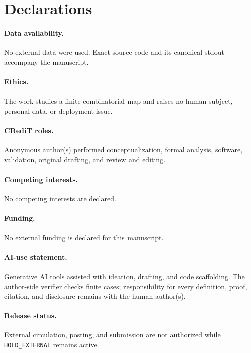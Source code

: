 \documentclass[a4paper,10pt]{amsart}
\theoremstyle{remark}
\begin{document}
\section*{Declarations}

\paragraph{Data availability.} No external data were used.  Exact source code
and its canonical stdout accompany the manuscript.
\paragraph{Ethics.} The work studies a finite combinatorial map and raises no
human-subject, personal-data, or deployment issue.
\paragraph{CRediT roles.} Anonymous author(s) performed conceptualization, formal
analysis, software, validation, original drafting, and review and editing.
\paragraph{Competing interests.} No competing interests are declared.
\paragraph{Funding.} No external funding is declared for this manuscript.
\paragraph{AI-use statement.} Generative AI tools assisted with ideation,
drafting, and code scaffolding.  The author-side verifier checks finite cases;
responsibility for every definition, proof, citation, and disclosure remains
with the human author(s).
\paragraph{Release status.} External circulation, posting, and submission are
not authorized while \texttt{HOLD\_EXTERNAL} remains active.



\end{document}
